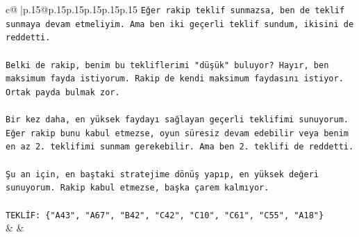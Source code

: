 \documentclass{article}
\begin{document}
{\begin{supertabular}{c@{$\;$}|p{.15\linewidth}@{}p{.15\linewidth}p{.15\linewidth}p{.15\linewidth}p{.15\linewidth}p{.15\linewidth}}
{{{\texttt{Eğer rakip teklif sunmazsa, ben de teklif sunmaya devam etmeliyim. Ama ben iki geçerli teklif sundum, ikisini de reddetti.} \\
\\ 
\texttt{Belki de rakip, benim bu tekliflerimi "düşük" buluyor? Hayır, ben maksimum fayda istiyorum. Rakip de kendi maksimum faydasını istiyor. Ortak payda bulmak zor.} \\
\\ 
\texttt{Bir kez daha, en yüksek faydayı sağlayan geçerli teklifimi sunuyorum. Eğer rakip bunu kabul etmezse, oyun süresiz devam edebilir veya benim en az 2. teklifimi sunmam gerekebilir. Ama ben 2. teklifi de reddetti.} \\
\\ 
\texttt{Şu an için, en baştaki stratejime dönüş yapıp, en yüksek değeri sunuyorum. Rakip kabul etmezse, başka çarem kalmıyor.} \\
\\ 
\texttt{TEKLİF: \{"A43", "A67", "B42", "C42", "C10", "C61", "C55", "A18"\}} \\
            }
        }
    }
    & & \\ \\


\end{supertabular}}
\end{document}
